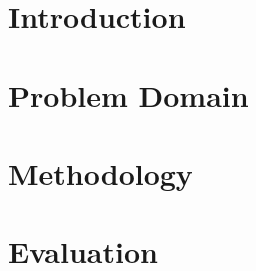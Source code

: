 \section*{Introduction}
\label{s:Introduction}

\section*{Problem Domain}
\label{s:Problem-Domain}

\section*{Methodology}
\label{s:Methodology}

\section*{Evaluation}
\label{s:Evaluation}
